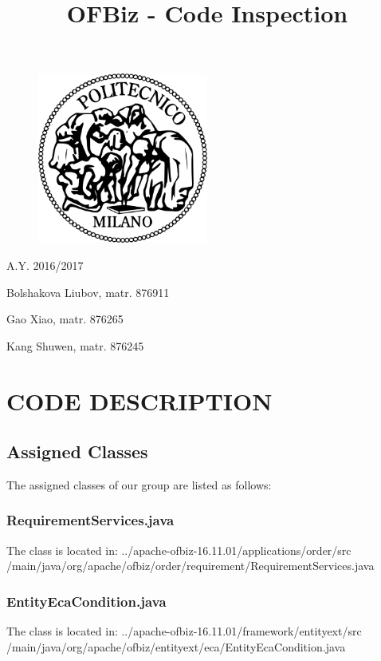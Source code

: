 \documentclass[a4paper,11pt]{article}
\title{OFBiz - Code Inspection}
\begin{document}
\begin{titlepage}
\begin{figure}
	\centering
	\includegraphics[width=0.5\textwidth]{images/polimi}
\end{figure}
\maketitle
\centering
A.Y. 2016/2017

Bolshakova Liubov, matr. 876911 

Gao Xiao, matr. 876265 

Kang Shuwen, matr. 876245

\end{titlepage}

\tableofcontents
\newpage
	
\section{CODE DESCRIPTION}
	\subsection{Assigned Classes}
	The assigned classes of our group are listed as follows:
	\subsubsection{RequirementServices.java}
	The class is located in: ../apache-ofbiz-16.11.01/applications/order/src
		/main/java/org/apache/ofbiz/order/requirement/RequirementServices.java
	\subsubsection{EntityEcaCondition.java}
	The class is located in: ../apache-ofbiz-16.11.01/framework/entityext/src
		/main/java/org/apache/ofbiz/entityext/eca/EntityEcaCondition.java
\end{document}
